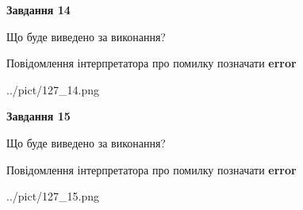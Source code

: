 \documentclass[11pt, ukrainian]{article}
\begin{document}
{\begin {large}
{\begin {center}\textbf{Завдання 14}\end {center}}\par
Що буде виведено за виконання? \par
Повідомлення інтерпретатора про помилку позначати \textbf{error}

\begin{center}
	{../pict/127_14.png}
\end{center}
\newpage

{\begin {center}\textbf{Завдання 15}\end {center}}\par
Що буде виведено за виконання? \par
Повідомлення інтерпретатора про помилку позначати \textbf{error}

\begin{center}
	{../pict/127_15.png}
\end{center}
\newpage

\end {large}}
\end{document}
